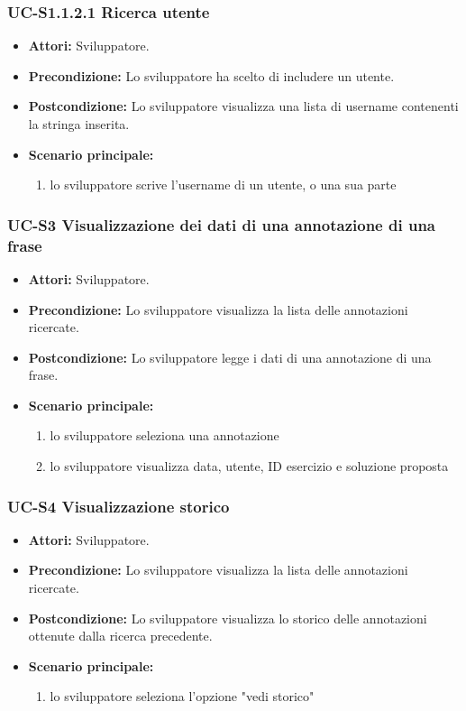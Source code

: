 	\subsubsection{UC-S1.1.2.1 Ricerca utente}
		\begin{itemize}
			\item \textbf{Attori:} Sviluppatore.
			\item \textbf{Precondizione:} Lo sviluppatore ha scelto di includere un utente.
			\item \textbf{Postcondizione:} Lo sviluppatore visualizza una lista di username contenenti la stringa inserita.
			\item \textbf{Scenario principale:}
			\begin{enumerate}
				\item lo sviluppatore scrive l'username di un utente, o una sua parte
			\end{enumerate}
		\end{itemize}		
			
	\subsubsection{UC-S3 Visualizzazione dei dati di una annotazione di una frase}
		\begin{itemize}
			\item \textbf{Attori:} Sviluppatore.
			\item \textbf{Precondizione:} Lo sviluppatore visualizza la lista delle annotazioni ricercate.
			\item \textbf{Postcondizione:} Lo sviluppatore legge i dati di una annotazione di una frase.
			\item \textbf{Scenario principale:}
				\begin{enumerate}
					\item lo sviluppatore seleziona una annotazione
					\item lo sviluppatore visualizza data, utente, ID esercizio e soluzione proposta
				\end{enumerate}
		\end{itemize}
	
	\subsubsection{UC-S4 Visualizzazione storico}		
		\begin{itemize}
			\item \textbf{Attori:} Sviluppatore.
			\item \textbf{Precondizione:} Lo sviluppatore visualizza la lista delle annotazioni ricercate.
			\item \textbf{Postcondizione:} Lo sviluppatore visualizza lo storico delle annotazioni ottenute dalla ricerca precedente.
			\item \textbf{Scenario principale:}
			\begin{enumerate}
				\item lo sviluppatore seleziona l'opzione "vedi storico"
			\end{enumerate}
		\end{itemize}	
		
